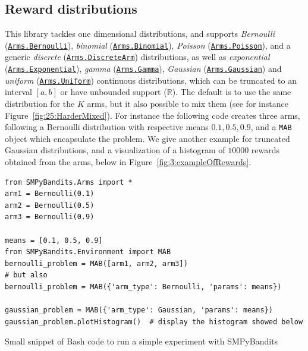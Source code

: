 \subsection{Reward distributions}
%
This library tackles one dimensional distributions,
and supports \emph{Bernoulli} (\texttt{\href{https://smpybandits.github.io/docs/Arms.Bernoulli.html}{Arms.Bernoulli}}), \emph{binomial} (\texttt{\href{https://smpybandits.github.io/docs/Arms.Binomial.html}{Arms.Binomial}}), \emph{Poisson} (\texttt{\href{https://smpybandits.github.io/docs/Arms.Poisson.html}{Arms.Poisson}}), and a generic \emph{discrete} (\texttt{\href{https://smpybandits.github.io/docs/Arms.DiscreteArm.html}{Arms.DiscreteArm}}) distributions,
as well as \emph{exponential} (\texttt{\href{https://smpybandits.github.io/docs/Arms.Exponential.html}{Arms.Exponential}}), \emph{gamma} (\texttt{\href{https://smpybandits.github.io/docs/Arms.Gamma.html}{Arms.Gamma}}), \emph{Gaussian} (\texttt{\href{https://smpybandits.github.io/docs/Arms.Gaussian.html}{Arms.Gaussian}}) and \emph{uniform} (\texttt{\href{https://smpybandits.github.io/docs/Arms.Uniform.html}{Arms.Uniform}}) continuous distributions,
which can be truncated to an interval $[a,b]$ or have unbounded support ($\mathbb{R}$).
%
The default is to use the same distribution for the $K$ arms, but it also possible to mix them (see for instance Figure~\ref{fig:25:HarderMixed}).
%
For instance the following code creates three arms, following a Bernoulli distribution with respective means $0.1, 0.5, 0.9$, and a \texttt{MAB} object which encapsulate the problem.
We give another example for truncated Gaussian distributions, and a visualization of a histogram of $10000$ rewards obtained from the arms, below in Figure~\ref{fig:3:exampleOfRewards}.

\begin{small}
\begin{listing}[h!]
    \begin{verbatim}
from SMPyBandits.Arms import *
arm1 = Bernoulli(0.1)
arm2 = Bernoulli(0.5)
arm3 = Bernoulli(0.9)

means = [0.1, 0.5, 0.9]
from SMPyBandits.Environment import MAB
bernoulli_problem = MAB([arm1, arm2, arm3])
# but also
bernoulli_problem = MAB({'arm_type': Bernoulli, 'params': means})

gaussian_problem = MAB({'arm_type': Gaussian, 'params': means})
gaussian_problem.plotHistogram()  # display the histogram showed below
    \end{verbatim}
    \caption{Small snippet of Bash code to run a simple experiment with SMPyBandits}
    \label{lst:3:howToRunBasicLibrary}
\end{listing}
\end{small}

